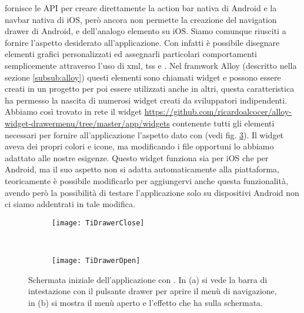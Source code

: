 			\tisdk{} fornisce le API per creare direttamente la action bar nativa 
			di Android e la navbar nativa di iOS, però ancora non permette la 
			creazione del navigation drawer di Android, e dell'analogo 
			elemento su iOS. Siamo comunque riusciti a fornire l'aspetto 
			desiderato all'applicazione.
			Con \tisdk{} infatti è possibile disegnare elementi grafici 
			personalizzati ed assegnarli particolari comportamenti 
			semplicemente attraverso l'uso di xml, tss e \js{}. Nel framwork Alloy 
			(descritto nella sezione \ref{subsub:alloy}) questi elementi sono 
			chiamati widget e possono essere creati in un progetto per poi essere 
			utilizzati anche in altri, questa caratteristica ha permesso la nascita 
			di numerosi widget creati 
			da sviluppatori indipendenti. 
			Abbiamo così trovato in rete il widget \url{https://github.com/ricardoalcocer/alloy-widget-drawermenu/tree/master/app/widgets}
			contenente tutti gli elementi necessari per fornire all'applicazione 
			l'aspetto dato con \kendomob{} (vedi fig. \ref{fig:tidrawer}). 
			Il widget aveva dei propri colori e icone, ma modificando i file 
			opportuni lo abbiamo adattato alle nostre esigenze.
			Questo widget funziona sia per iOS che per Android, ma il suo aspetto 
			non si adatta automaticamente alla piattaforma, teoricamente è possibile
			modificarlo per aggiungervi anche questa funzionalità, avendo però 
			la possibilità di testare l'applicazione solo su dispositivi Android non 
			ci siamo addentrati in tale modifica.
			
			\begin{figure}[h]
				\centering
				\begin{subfigure}[b]{0.485\textwidth}
					\texttt{[image: TiDrawerClose]}
					\caption{}
					\label{fig:tiDrawerClose}
				\end{subfigure}
				~
				\begin{subfigure}[b]{0.485\textwidth}
					\texttt{[image: TiDrawerOpen]}
					\caption{}
					\label{fig:tiDrawerOpen}
				\end{subfigure}
				\caption{Schermata iniziale dell'applicazione con \tisdk{}. 
				In (a) si vede la barra di intestazione con il pulsante drawer per aprire 
				il menù di navigazione, in (b) si mostra il menù aperto 
				e l'effetto che ha sulla schermata.}
				\label{fig:tidrawer}
			\end{figure} 
